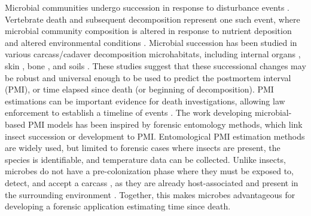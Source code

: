 \documentclass[
  10pt,
  letterpaper,
]{article}
\begin{document}
Microbial communities undergo succession in response to disturbance
events \citep{shade_fundamentals_2012}. Vertebrate death and subsequent
decomposition represent one such event, where microbial community
composition is altered in response to nutrient deposition and altered
environmental conditions
\citep{howard_characterization_2010, pechal_potential_2014, metcalf_microbial_2013, cobaugh_functional_2015, javan_human_2016, mason_microbial_2023}.
Microbial succession has been studied in various carcass/cadaver
decomposition microhabitats, including internal organs
\citep{javan_thanatomicrobiome_2016, bell_sex-related_2018, can_distinctive_2014, lutz_effects_2020, li_potential_2021, hauther_estimating_2015, dong_succession_2019},
skin
\citep{pechal_potential_2014, metcalf_microbial_2013, hyde_initial_2015, pechal_large-scale_2018, johnson_machine_2016, metcalf_microbial_2016},
bone \citep{damann_potential_2015, emmons_postmortem_2022}, and soils
\citep{metcalf_microbial_2013, cobaugh_functional_2015, metcalf_microbial_2016, singh_temporal_2017, mason_body_2022}.
These studies suggest that these successional changes may be robust and
universal enough to be used to predict the postmortem interval (PMI), or
time elapsed since death (or beginning of decomposition). PMI
estimations can be important evidence for death investigations, allowing
law enforcement to establish a timeline of events
\citep{moffatt_improved_2016}. The work developing microbial-based PMI
models has been inspired by forensic entomology methods, which link
insect succession or development to PMI. Entomological PMI estimation
methods are widely used, but limited to forensic cases where insects are
present, the species is identifiable, and temperature data can be
collected. Unlike insects, microbes do not have a pre-colonization phase
where they must be exposed to, detect, and accept a carcass
\citep{tarone_is_2017, tomberlin_roadmap_2011}, as they are already
host-associated and present in the surrounding environment
\citep{mason_microbial_2023}. Together, this makes microbes advantageous
for developing a forensic application estimating time since death.
\end{document}
